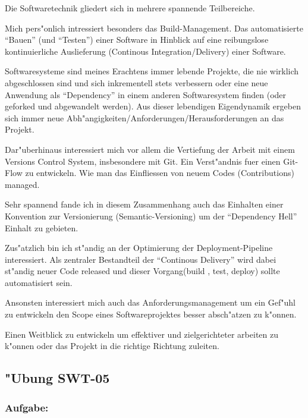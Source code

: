 Die Softwaretechnik gliedert sich in mehrere spannende Teilbereiche.

Mich pers"onlich intressiert besonders das Build-Management. Das automatisierte ``Bauen'' (und ``Testen'') einer Software in Hinblick auf eine reibungslose kontinuierliche Auslieferung (Continous Integration/Delivery) einer Software.

Softwaresysteme sind meines Erachtens immer lebende Projekte, die nie wirklich abgeschlossen sind und sich inkrementell stets verbessern oder eine neue Anwendung als ``Dependency'' in einem anderen Softwaresystem finden (oder geforked und abgewandelt werden).
Aus dieser lebendigen Eigendynamik ergeben sich immer neue Abh"angigkeiten/Anforderungen/Herausforderungen an das Projekt.

Dar"uberhinaus interessiert mich vor allem die Vertiefung der Arbeit mit einem Versions Control System, insbesondere mit Git.
Ein Verst"andnis fuer einen Git-Flow zu entwickeln. Wie man das Einfliessen von neuem Codes (Contributions) managed.

Sehr spannend fande ich in diesem Zusammenhang auch das Einhalten einer Konvention zur Versionierung (Semantic-Versioning) um der ``Dependency Hell'' Einhalt zu gebieten.

Zus"atzlich bin ich st"andig an der Optimierung der Deployment-Pipeline interessiert.
Als zentraler Bestandteil der ``Continous Delivery'' wird dabei st"andig neuer Code released und dieser Vorgang(build , test, deploy) sollte automatisiert sein.

Ansonsten interessiert mich auch das Anforderungsmanagement um ein Gef"uhl zu entwickeln den Scope eines Softwareprojektes besser absch"atzen zu k"onnen.

Einen Weitblick zu entwickeln um effektiver und zielgerichteter arbeiten zu k"onnen oder das Projekt in die richtige Richtung zuleiten.

\newpage
\subsection{"Ubung SWT-05}
\subsubsection*{Aufgabe:}

